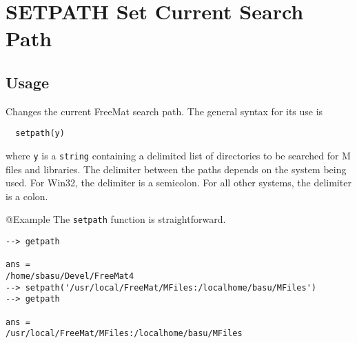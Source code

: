 \section{SETPATH Set Current Search Path}

\subsection{Usage}

Changes the current FreeMat search path.  The general syntax for
its use is
\begin{verbatim}
  setpath(y)
\end{verbatim}
where \verb|y| is a \verb|string| containing a delimited list of directories
to be searched for M files and libraries.  
The delimiter between the paths depends on the system being used.  For Win32, the
delimiter is a semicolon.  For all other systems, the delimiter is a colon.

@Example
The \verb|setpath| function is straightforward.
\begin{verbatim}
--> getpath

ans = 
/home/sbasu/Devel/FreeMat4
--> setpath('/usr/local/FreeMat/MFiles:/localhome/basu/MFiles')
--> getpath

ans = 
/usr/local/FreeMat/MFiles:/localhome/basu/MFiles
\end{verbatim}
